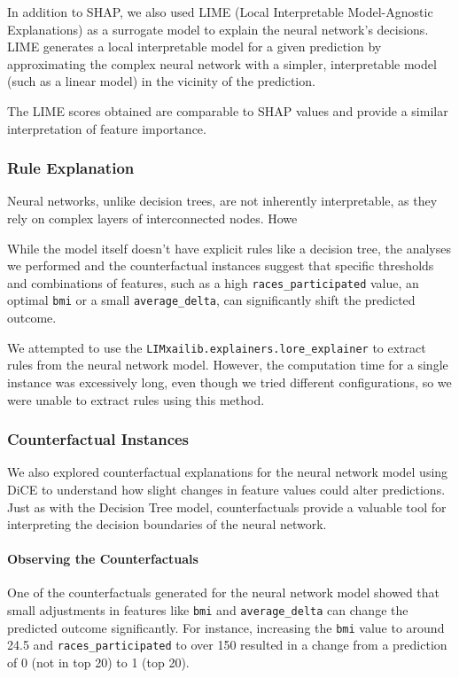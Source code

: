 \documentclass{article}
\begin{document}
In addition to SHAP, we also used LIME (Local Interpretable Model-Agnostic Explanations) as a surrogate model to explain the neural network’s decisions. LIME generates a local interpretable model for a given prediction by approximating the complex neural network with a simpler, interpretable model (such as a linear model) in the vicinity of the prediction.

The LIME scores obtained are comparable to SHAP values and provide a similar interpretation of feature importance.


\subsubsection{Rule Explanation}

Neural networks, unlike decision trees, are not inherently interpretable, as they rely on complex layers of interconnected nodes. Howe

While the model itself doesn't have explicit rules like a decision tree, the analyses we performed and the counterfactual instances suggest that specific thresholds and combinations of features, such as a high \texttt{races\_participated} value, an optimal \texttt{bmi} or a small \texttt{average\_delta}, can significantly shift the predicted outcome.

We attempted to use the \texttt{LIMxailib.explainers.lore\_explainer} to extract rules from the neural network model. However, the computation time for a single instance was excessively long, even though we tried different configurations, so we were unable to extract rules using this method.




\subsubsection{Counterfactual Instances}

We also explored counterfactual explanations for the neural network model using DiCE to understand how slight changes in feature values could alter predictions. Just as with the Decision Tree model, counterfactuals provide a valuable tool for interpreting the decision boundaries of the neural network.

\paragraph{Observing the Counterfactuals}

One of the counterfactuals generated for the neural network model showed that small adjustments in features like \texttt{bmi} and \texttt{average\_delta} can change the predicted outcome significantly. For instance, increasing the \texttt{bmi} value to around 24.5 and \texttt{races\_participated} to over 150 resulted in a change from a prediction of 0 (not in top 20) to 1 (top 20).
\end{document}
